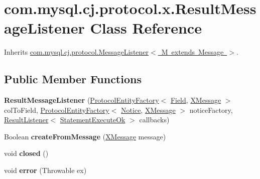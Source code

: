 \hypertarget{classcom_1_1mysql_1_1cj_1_1protocol_1_1x_1_1_result_message_listener}{}\section{com.\+mysql.\+cj.\+protocol.\+x.\+Result\+Message\+Listener Class Reference}
\label{classcom_1_1mysql_1_1cj_1_1protocol_1_1x_1_1_result_message_listener}


Inherits \mbox{\hyperlink{interfacecom_1_1mysql_1_1cj_1_1protocol_1_1_message_listener}{com.\+mysql.\+cj.\+protocol.\+Message\+Listener$<$ M extends Message $>$}}.

\subsection*{Public Member Functions}
\begin{DoxyCompactItemize}
\item 
\mbox{\label{classcom_1_1mysql_1_1cj_1_1protocol_1_1x_1_1_result_message_listener_a11f2adec18c2182473f77f004b237984}} 
{\bfseries Result\+Message\+Listener} (\mbox{\hyperlink{interfacecom_1_1mysql_1_1cj_1_1protocol_1_1_protocol_entity_factory}{Protocol\+Entity\+Factory}}$<$ \mbox{\hyperlink{classcom_1_1mysql_1_1cj_1_1result_1_1_field}{Field}}, \mbox{\hyperlink{classcom_1_1mysql_1_1cj_1_1protocol_1_1x_1_1_x_message}{X\+Message}} $>$ col\+To\+Field, \mbox{\hyperlink{interfacecom_1_1mysql_1_1cj_1_1protocol_1_1_protocol_entity_factory}{Protocol\+Entity\+Factory}}$<$ \mbox{\hyperlink{classcom_1_1mysql_1_1cj_1_1protocol_1_1x_1_1_notice}{Notice}}, \mbox{\hyperlink{classcom_1_1mysql_1_1cj_1_1protocol_1_1x_1_1_x_message}{X\+Message}} $>$ notice\+Factory, \mbox{\hyperlink{interfacecom_1_1mysql_1_1cj_1_1protocol_1_1_result_listener}{Result\+Listener}}$<$ \mbox{\hyperlink{classcom_1_1mysql_1_1cj_1_1protocol_1_1x_1_1_statement_execute_ok}{Statement\+Execute\+Ok}} $>$ callbacks)
\item 
\mbox{\label{classcom_1_1mysql_1_1cj_1_1protocol_1_1x_1_1_result_message_listener_a08fc8c82309b101b59b186522c051a13}} 
Boolean {\bfseries create\+From\+Message} (\mbox{\hyperlink{classcom_1_1mysql_1_1cj_1_1protocol_1_1x_1_1_x_message}{X\+Message}} message)
\item 
\mbox{\label{classcom_1_1mysql_1_1cj_1_1protocol_1_1x_1_1_result_message_listener_a72527b705b89b553d393412f88615f86}} 
void {\bfseries closed} ()
\item 
\mbox{\label{classcom_1_1mysql_1_1cj_1_1protocol_1_1x_1_1_result_message_listener_ad8c3856e573b2bcad94f5b914e5f9c82}} 
void {\bfseries error} (Throwable ex)
\end{DoxyCompactItemize}


